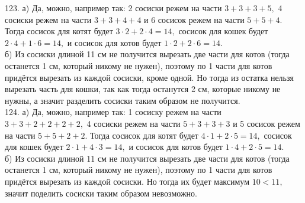 123. а) Да, можно, например так: 2 сосиски режем на части $3+3+3+5,$ 4 сосиски режем на части $3+3+4+4$ и 6 сосисок режем на части $5+5+4.$ Тогда сосисок для котят будет $3\cdot2+2\cdot4=14,$ сосисок для кошек будет $2\cdot4+1\cdot6=14,$ и сосисок для котов будет $1\cdot2+2\cdot6=14.$\\
б) Из сосиски длиной 11 см не получится вырезать две части для котов (тогда останется 1 см, который никому не нужен), поэтому по 1 части для котов придётся вырезать из каждой сосиски, кроме одной. Но тогда из остатка нельзя вырезать часть для кошки, так как тогда останутся 2 см, которые никому не нужны, а значит разделить сосиски таким образом не получится.\\
124. а) Да, можно, например так: 1 сосиску режем на части $3+3+2+2+2+2,$ 4 сосиски режем на части $5+3+3+3$ и 5 сосисок режем на части $5+5+2+2.$ Тогда сосисок для котят будет $4\cdot1+2\cdot5=14,$ сосисок для кошек будет $2\cdot1+4\cdot3=14,$ и сосисок для котов будет $1\cdot4+2\cdot5=14.$\\
б) Из сосиски длиной 11 см не получится вырезать две части для котов (тогда останется 1 см, который никому не нужен), поэтому по 1 части для котов придётся вырезать из каждой сосиски. Но тогда их будет максимум $10<11,$ значит поделить сосиски таким образом невозможно.
\newpage
